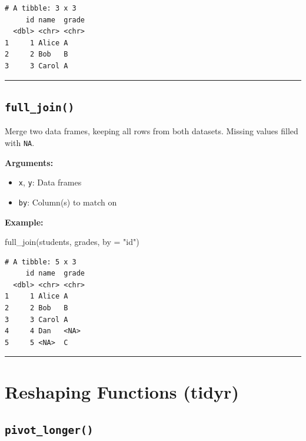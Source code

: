 \documentclass[
  letterpaper,
  DIV=11,
  numbers=noendperiod]{scrreprt}
\newenvironment{Shaded}{\begin{snugshade}}{\end{snugshade}}
\newcommand{\AttributeTok}[1]{\textcolor[rgb]{0.40,0.45,0.13}{#1}}
\newcommand{\FunctionTok}[1]{\textcolor[rgb]{0.28,0.35,0.67}{#1}}
\newcommand{\NormalTok}[1]{\textcolor[rgb]{0.00,0.23,0.31}{#1}}
\newcommand{\StringTok}[1]{\textcolor[rgb]{0.13,0.47,0.30}{#1}}
\providecommand{\tightlist}{%
  \setlength{\itemsep}{0pt}\setlength{\parskip}{0pt}}
\begin{document}
\begin{verbatim}
# A tibble: 3 x 3
     id name  grade
  <dbl> <chr> <chr>
1     1 Alice A    
2     2 Bob   B    
3     3 Carol A    
\end{verbatim}

\begin{center}\rule{0.5\linewidth}{0.5pt}\end{center}

\subsection{\texorpdfstring{\texttt{full\_join()}}{full\_join()}}\label{full_join-1}

Merge two data frames, keeping all rows from both datasets. Missing
values filled with \texttt{NA}.

\textbf{Arguments:}

\begin{itemize}
\tightlist
\item
  \texttt{x}, \texttt{y}: Data frames
\item
  \texttt{by}: Column(s) to match on
\end{itemize}

\textbf{Example:}

\begin{Shaded}
\begin{Highlighting}[]
\FunctionTok{full\_join}\NormalTok{(students, grades, }\AttributeTok{by =} \StringTok{"id"}\NormalTok{)}
\end{Highlighting}
\end{Shaded}

\begin{verbatim}
# A tibble: 5 x 3
     id name  grade
  <dbl> <chr> <chr>
1     1 Alice A    
2     2 Bob   B    
3     3 Carol A    
4     4 Dan   <NA> 
5     5 <NA>  C    
\end{verbatim}

\begin{center}\rule{0.5\linewidth}{0.5pt}\end{center}

\section{Reshaping Functions (tidyr)}\label{reshaping-functions-tidyr}

\subsection{\texorpdfstring{\texttt{pivot\_longer()}}{pivot\_longer()}}\label{pivot_longer}
\end{document}
